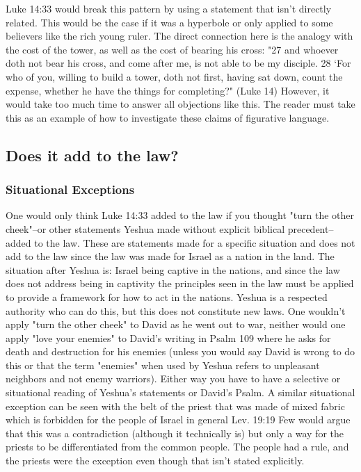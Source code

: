 \documentclass[11pt]{article}
\begin{document}
Luke 14:33 would break this pattern by using a statement that isn't directly related. This would be the case if it was a hyperbole or only applied to some believers like the rich young ruler. The direct connection here is the analogy with the cost of the tower, as well as the cost of bearing his cross: 
"27 and whoever doth not bear his cross, and come after me, is not able to be my disciple. 28 `For who of you, willing to build a tower, doth not first, having sat down, count the expense, whether he have the things for completing?" (Luke 14)
 However, it would take too much time to answer all objections like this. The reader must take this as an example of how to investigate these claims of figurative language. 

\subsection{Does it add to the law?}
\subsubsection{Situational Exceptions} %
One would only think Luke 14:33 added to the law if you thought "turn the other cheek"--or other statements Yeshua made without explicit biblical precedent--added to the law. These are statements made for a specific situation and does not add to the law since the law was made for Israel as a nation in the land. The situation after Yeshua is: Israel being captive in the nations, and since the law does not address being in captivity the principles seen in the law must be applied to provide a framework for how to act in the nations. Yeshua is a respected authority who can do this, but this does not constitute new laws. One wouldn't apply "turn the other cheek" to David as he went out to war, neither would one apply "love your enemies" to David's writing in Psalm 109 where he asks for death and destruction for his enemies (unless you would say David is wrong to do this or that the term "enemies" when used by Yeshua refers to unpleasant neighbors and not enemy warriors). Either way you have to have a selective or situational reading of Yeshua's statements or David's Psalm. A similar situational exception can be seen with the belt of the priest that was made of mixed fabric which is forbidden for the people of Israel in general Lev. 19:19 \cite{shatnez} Few would argue that this was a contradiction (although it technically is) but only a way for the priests to be differentiated from the common people. The people had a rule, and the priests were the exception even though that isn't stated explicitly. 
\end{document}
